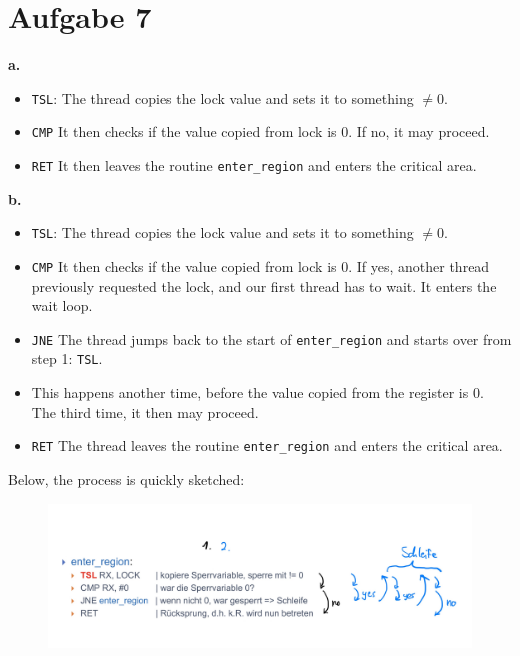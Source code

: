 \documentclass{article}
\begin{document}
\section*{Aufgabe 7}
\textbf{a.}
\begin{itemize}
    \item \texttt{TSL}: The thread copies the lock value and sets it to something \( 
	    \neq 0  \).
    \item \texttt{CMP} It then checks if the value copied from lock is 0. If no, it
       may proceed.
   \item \texttt{RET} It then leaves the routine \texttt{enter\_region} and
      enters the critical area. 
\end{itemize}
\textbf{b.} 
\begin{itemize}
    \item \texttt{TSL}: The thread copies the lock value and sets it to something \( 
	    \neq 0  \).
    \item \texttt{CMP} It then checks if the value copied from lock is 0.
	If yes, another thread previously requested the lock, and our first
	thread has to wait. It enters the wait loop.
	\item \texttt{JNE} The thread jumps back to the start of
	    \texttt{enter\_region} and starts over from step 1: \texttt{TSL}. 
	\item This happens another time, before the value copied from the
	   register is 0. The third time, it then may proceed. 
       \item \texttt{RET} The thread leaves the routine \texttt{enter\_region}
	   and enters the critical area.
\end{itemize}
Below, the process is quickly sketched:
\begin{figure}[H]
    \centering
    \includegraphics[width=8\textwidth]{Sketch.jpg}
\end{figure}
\end{document}
